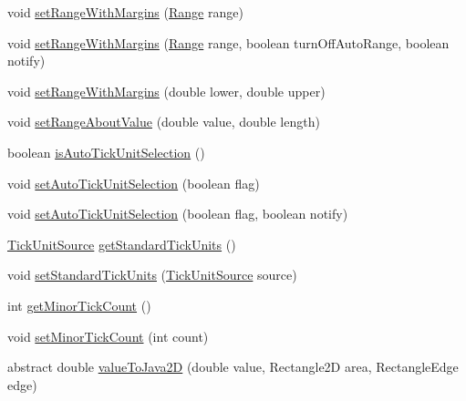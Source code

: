 \begin{DoxyCompactItemize}
\item 
void \mbox{\hyperlink{classorg_1_1jfree_1_1chart_1_1axis_1_1_value_axis_a399e3f7045339d3bf5cda69a7eafb482}{set\+Range\+With\+Margins}} (\mbox{\hyperlink{classorg_1_1jfree_1_1data_1_1_range}{Range}} range)
\item 
void \mbox{\hyperlink{classorg_1_1jfree_1_1chart_1_1axis_1_1_value_axis_a0dcad02972acb0c72c29d579e3dda5b2}{set\+Range\+With\+Margins}} (\mbox{\hyperlink{classorg_1_1jfree_1_1data_1_1_range}{Range}} range, boolean turn\+Off\+Auto\+Range, boolean notify)
\item 
void \mbox{\hyperlink{classorg_1_1jfree_1_1chart_1_1axis_1_1_value_axis_aa4929572cc91ceca0f424c310ece9e5d}{set\+Range\+With\+Margins}} (double lower, double upper)
\item 
void \mbox{\hyperlink{classorg_1_1jfree_1_1chart_1_1axis_1_1_value_axis_a4647712d5c422013e1408559ee43d38f}{set\+Range\+About\+Value}} (double value, double length)
\item 
boolean \mbox{\hyperlink{classorg_1_1jfree_1_1chart_1_1axis_1_1_value_axis_adc265a92cee6f4f50dcf0701f86d3cab}{is\+Auto\+Tick\+Unit\+Selection}} ()
\item 
void \mbox{\hyperlink{classorg_1_1jfree_1_1chart_1_1axis_1_1_value_axis_a7366393f75b07420136f449d351deb08}{set\+Auto\+Tick\+Unit\+Selection}} (boolean flag)
\item 
void \mbox{\hyperlink{classorg_1_1jfree_1_1chart_1_1axis_1_1_value_axis_a5cab45ce7f2a0eecd0940f206b42a1c6}{set\+Auto\+Tick\+Unit\+Selection}} (boolean flag, boolean notify)
\item 
\mbox{\hyperlink{interfaceorg_1_1jfree_1_1chart_1_1axis_1_1_tick_unit_source}{Tick\+Unit\+Source}} \mbox{\hyperlink{classorg_1_1jfree_1_1chart_1_1axis_1_1_value_axis_afe89ca3b6b4503e8f97ec9173d1f49f7}{get\+Standard\+Tick\+Units}} ()
\item 
void \mbox{\hyperlink{classorg_1_1jfree_1_1chart_1_1axis_1_1_value_axis_ac84e1ffa28cdea7b355306ae472d21a2}{set\+Standard\+Tick\+Units}} (\mbox{\hyperlink{interfaceorg_1_1jfree_1_1chart_1_1axis_1_1_tick_unit_source}{Tick\+Unit\+Source}} source)
\item 
int \mbox{\hyperlink{classorg_1_1jfree_1_1chart_1_1axis_1_1_value_axis_a8cb8bb0f108e528454263e94bd1bd35c}{get\+Minor\+Tick\+Count}} ()
\item 
void \mbox{\hyperlink{classorg_1_1jfree_1_1chart_1_1axis_1_1_value_axis_a4c9475cb0828091509a36f19d300f84c}{set\+Minor\+Tick\+Count}} (int count)
\item 
abstract double \mbox{\hyperlink{classorg_1_1jfree_1_1chart_1_1axis_1_1_value_axis_ab5bb3a4ed5db8a846a76ffe4f2ce9c38}{value\+To\+Java2D}} (double value, Rectangle2D area, Rectangle\+Edge edge)

\end{DoxyCompactItemize}
